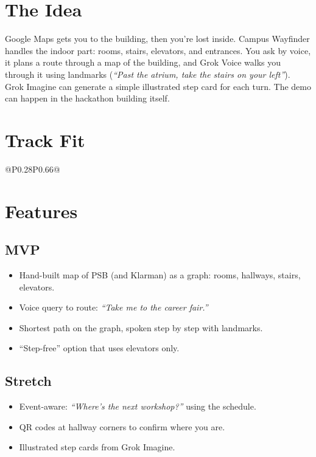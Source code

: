 \documentclass[11pt]{article}
\begin{document}

\section{The Idea}
Google Maps gets you to the building, then you're lost inside. Campus Wayfinder
handles the indoor part: rooms, stairs, elevators, and entrances. You ask by voice,
it plans a route through a map of the building, and Grok Voice walks you through
it using landmarks (\emph{``Past the atrium, take the stairs on your left''}).
Grok Imagine can generate a simple illustrated step card for each turn. The demo
can happen in the hackathon building itself.

\section{Track Fit}
\begin{tabular}{@{}P{0.28\textwidth}P{0.66\textwidth}@{}}
\toprule
{}
\bottomrule
\end{tabular}

\section{Features}
\subsection{MVP}
\begin{itemize}
  \item Hand-built map of PSB (and Klarman) as a graph: rooms, hallways, stairs, elevators.
  \item Voice query to route: \emph{``Take me to the career fair.''}
  \item Shortest path on the graph, spoken step by step with landmarks.
  \item ``Step-free'' option that uses elevators only.
\end{itemize}
\subsection{Stretch}
\begin{itemize}
  \item Event-aware: \emph{``Where's the next workshop?''} using the schedule.
  \item QR codes at hallway corners to confirm where you are.
  \item Illustrated step cards from Grok Imagine.
\end{itemize}
\end{document}
